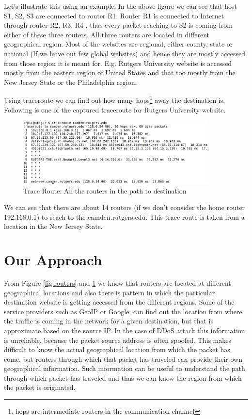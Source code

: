 \documentclass[10pt,oneside,a4paper]{article}
\begin{document}
Let's illustrate this using an example. In the above figure we can see that host S1, S2, S3 are connected to router R1. Router R1 is connected to Internet through router R2, R3, R4 , thus every packet reaching to S2 is coming from either of these three routers. All three routers are located in different geographical region. Most of the websites are regional, either county, state or national (If we leave out few global websites) and hence they are mostly accessed from those region it is meant for. E.g. Rutgers University website is accessed mostly from the eastern region of United States and that too mostly from the New Jersey State or the Philadelphia region.\par
Using traceroute we can find out how many hops\footnote{hops are intermediate routers in the communication channel} away the destination is. Following is one of the captured traceroute for Rutgers University website.\par
\begin{figure}[H]
\centering
\includegraphics[width=0.90\textwidth]{TraceRoute.png}
\caption{Trace Route: All the routers in the path to destination} \label{fig:traceroute}
\end{figure}

We can see that there are about 14 routers (if we don't consider the home router 192.168.0.1) to reach to the camden.rutgers.edu. This trace route is taken from a location in the New Jersey State.\par

\section{Our Approach}

From Figure \ref{fig:routers} and \ref{fig:traceroute} we know that routers are located at different geographical locations and also there is pattern in which the particular destination website is getting accessed from the different regions. Some of the service providers such as  GeoIP or Google, can find out the location from where the traffic is coming in the network for a given destination, but that is approximate based on the source IP. In the case of DDoS attack this information is unreliable, because the packet source address is often spoofed. This makes difficult to know the actual geographical location from which the packet has come, but routers through which that packet has traveled can provide their own geographical information. Such information can be useful to understand the path through which packet has traveled and thus we can know the region from which the packet is originated.\par
\end{document}
